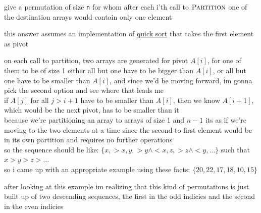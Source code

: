 \documentclass[a4paper,12pt]{article}
\begin{document}
\begin{question}
give a permutation of size \texttt{n} for whom after each i'th call to \(\textsc{Partition}\) one of the destination arrays would contain only one element\\[0pt]
\begin{answer}
\begin{note}
this answer assumes an implementation of \href{20221105005344-sorting_algorithm.org}{quick sort} that takes the first element as pivot\\[0pt]
\end{note}
on each call to partition, two arrays are generated for pivot \(A[i]\), for one of them to be of size 1 either all but one have to be bigger than \(A[i]\), or all but one have to be smaller than \(A[i]\), and since we'd be moving forward, im gonna pick the second option and see where that leads me\\[0pt]
if \(A[j]\) for all \(j > i+1\) have to be smaller than \(A[i]\), then we know \(A[i+1]\), which would be the next pivot, has to be smaller than it\\[0pt]
because we're partitioning an array to arrays of size 1 and \(n-1\) its as if we're moving to the two elements at a time since the second to first element would be in its own partition and requires no further operations\\[0pt]
so the sequence should be like: \(\{x,>x,y,>y \land <x,z,>z \land <y,\dots\}\) such that \(x>y>z>\dots\)\\[0pt]
so i came up with an appropriate example using these facts: \(\{20,22,17,18,10,15\}\)\\[0pt]
\begin{note}
after looking at this example im realizing that this kind of permutations is just built up of two descending sequences, the first in the odd indicies and the second in the even indicies\\[0pt]
\end{note}
\end{answer}
\end{question}
\end{document}

